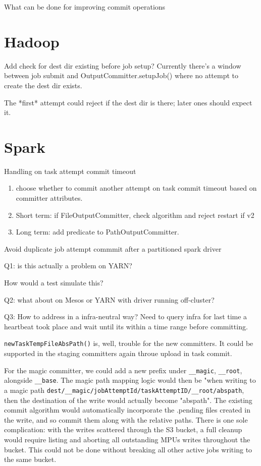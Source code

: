 \documentclass{article}
\begin{document}
What can be done for improving commit operations

\section{Hadoop}\label{sec:hadoop}

Add check for dest dir existing before job setup?
Currently there's a window between job submit and OutputCommitter.setupJob()
where no attempt to create the dest dir exists.

The *first* attempt could reject if the dest dir is there;
later ones should expect it.

\section{Spark}\label{sec:spark}

Handling on task attempt commit timeout

\begin{enumerate}
  \item choose whether to commit another attempt on task commit timeout based on committer attributes.
  \item Short term: if FileOutputCommitter, check algorithm and reject restart if v2
  \item Long term: add predicate to PathOutputCommitter.
\end{enumerate}

Avoid duplicate job attempt commmit after a partitioned spark driver

Q1: is this actually a problem on YARN?

How would a test simulate this?

Q2: what about on Mesos or YARN with driver running off-cluster?

Q3: How to address in a infra-neutral way?
Need to query infra for last time a heartbeat took place and wait until
its within a time range before committing.


\texttt{newTaskTempFileAbsPath()} is, well, trouble for the new committers.
It could be supported in the staging committers again throue upload in task commit.

For the magic committer, we could add a new prefix under \texttt{__magic},
\texttt{__root}, alongside \texttt{__base}.
The magic path mapping logic would then be "when writing to a magic path
\texttt{dest/__magic/jobAttemptId/taskAttemptID/__root/abspath}, then the destination of the write
would actually become "abspath".
The existing commit algorithm would automatically incorporate the .pending files
created in the write, and so commit them along with the relative paths.
There is one sole complication: with the writes scattered through the S3 bucket,
a full cleanup would require listing and aborting all outstanding MPUs
writes throughout the bucket.
This could not be done without breaking all other active jobs writing to
the same bucket.
\end{document}

